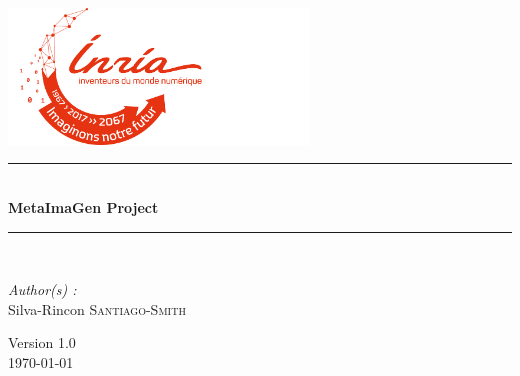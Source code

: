 \documentclass[a4paper,12pt]{book}
\theoremstyle{break}
\begin{document}

\begin{titlepage}
\begin{center}

\includegraphics[width=0.6\textwidth]{logo-isae-supaero}\\[1cm]



\rule{\linewidth}{0.5mm} \\[0.4cm]
{ \huge \bfseries MetaImaGen Project \\[0.4cm] }
\rule{\linewidth}{0.5mm} \\[1.5cm]

\noindent
\begin{minipage}{0.4\textwidth}
  \begin{flushleft} \large
    \emph{Author(s) :}\\
    Silva-Rincon \textsc{Santiago-Smith}\\
  \end{flushleft}
\end{minipage}%

\vfill

{\large Version 1.0\\ \today}

\end{center}
\end{titlepage}

\end{document}
